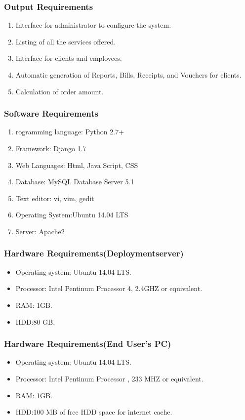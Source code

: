 \documentclass[12pt]{article}
\begin{document}
\subsubsection{Output Requirements}
\begin{enumerate}
\item Interface for administrator to configure the system.
\item  Listing of all the services offered.
\item  Interface for clients and employees.
\item  Automatic generation of Reports, Bills, Receipts, and Vouchers for clients.
\item  Calculation of order amount.
\end{enumerate}
\subsubsection{Software Requirements}
\begin{enumerate}
\item rogramming language: Python 2.7+
\item  Framework: Django 1.7
\item  Web Languages: Html, Java Script, CSS
\item  Database: MySQL Database Server 5.1
\item Text editor: vi, vim, gedit
\item Operating System:Ubuntu 14.04 LTS
\item Server: Apache2
\end{enumerate}
\subsubsection {Hardware Requirements(Deploymentserver)}
\begin{itemize}
\item Operating system: Ubuntu 14.04 LTS.
\item Processor: Intel Pentinum Processor 4, 2.4GHZ or equivalent.
\item RAM: 1GB.
\item HDD:80 GB.
\end{itemize} 
\subsubsection{Hardware Requirements(End User's PC)}
  \begin{itemize}
  \item Operating system: Ubuntu 14.04 LTS.
  \item Processor: Intel Pentinum Processor , 233 MHZ or equivalent.
  \item RAM: 1GB.
  \item HDD:100 MB of free HDD space for internet cache.
  \end{itemize}
\end{document}
